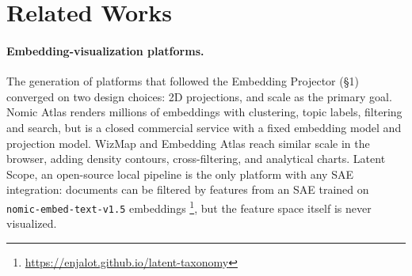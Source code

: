 \documentclass[11pt]{article}
\begin{document}


\section{Related Works}
\label{sec:related}

\paragraph{Embedding-visualization platforms.}



The generation of platforms that followed the Embedding Projector (\S1) converged on two design choices: 2D projections, and scale as the primary goal. Nomic Atlas \cite{nomic2022atlas} renders millions of embeddings with clustering, topic labels, filtering and search, but is a closed commercial service with a fixed embedding model and projection model. WizMap \cite{wang2023wizmapscalableinteractivevisualization} and Embedding Atlas \cite{ren2025embeddingatlaslowfrictioninteractive} reach similar scale in the browser, adding density contours, cross-filtering, and analytical charts. Latent Scope, \cite{johnson2024latentscope} an
open-source local pipeline is the only platform with any SAE integration: documents can be filtered by features from an SAE trained on \texttt{nomic-embed-text-v1.5} embeddings \footnote{\url{https://enjalot.github.io/latent-taxonomy}}, but the feature space itself is never visualized. 
\end{document}
